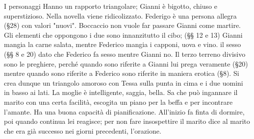 \documentclass[preview]{standalone}
\begin{document}
I personaggi
Hanno un rapporto triangolare; Gianni è bigotto, chiuso e superstizioso. Nella novella viene ridicolizzato. Federigo è una persona allegra (§28) con valori "nuovi".  Boccaccio non vuole far passare Gianni come martire. 
Gli elementi che oppongono i due sono innanzitutto il cibo; (§§ 12 e 13)  Gianni mangia la carne salata, mentre Federico mangia i capponi, uova e vino. il sesso (§§ 8 e 20) dato che Federico fa sesso mentre Gianni no.
Il terzo terreno divisivo sono le preghiere, perché quando sono riferite a Gianni lui prega veramente (§20) mentre quando sono riferite a Federico sono riferite in maniera erotica (§8). Si crea dunque un triangolo amoroso con Tessa sulla punta in cima e i due uomini in basso ai lati.
La moglie è intelligente, saggia, bella. Sa che può ingannare il marito con una certa facilità, escogita un piano per la beffa e per incontrare l'amante. Ha una buona capacità di pianificazione. All'inizio fa finta di dormire, poi quando continua lei reagisce; per non fare insospettire il marito dice al marito che era già successo nei giorni precedenti, l'orazione.  
\end{document}
